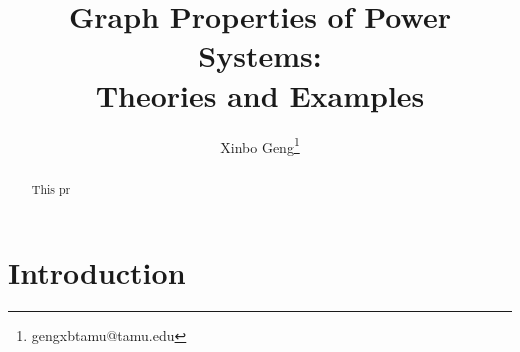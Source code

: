 \documentclass[letterpaper, 11pt]{article}
\title{Graph Properties of Power Systems:\\Theories and Examples}
\author{Xinbo Geng\thanks{gengxbtamu@tamu.edu}}
\theoremstyle{plain}
\theoremstyle{definition}
\begin{document}
\maketitle


\begin{abstract}
This pr
\end{abstract}

\tableofcontents

\newpage
\section{Introduction} %
\label{sec:introduction}









\end{document}
